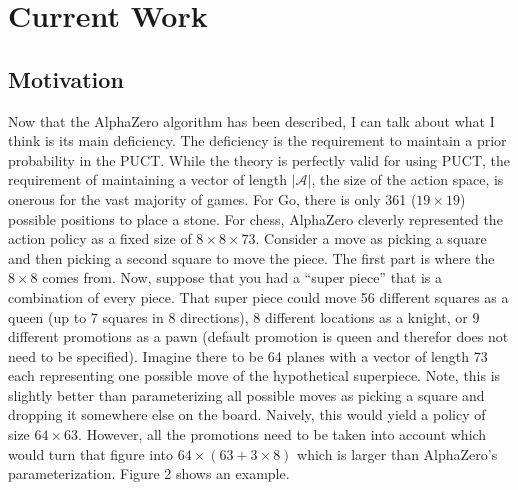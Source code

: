 \documentclass{article}
\begin{document}
  \clearpage

  \section{Current Work}

  \subsection{Motivation}

  Now that the AlphaZero algorithm has been described, I can talk about what I think is its main deficiency. The deficiency is the requirement to maintain a prior probability in the PUCT. While the theory is perfectly valid for using PUCT, the requirement of maintaining a vector of length $\lvert \mathcal{A} \rvert$, the size of the action space, is onerous for the vast majority of games. For Go, there is only 361 ($19 \times 19$) possible positions to place a stone. For chess, AlphaZero cleverly represented the action policy as a fixed size of $8 \times 8 \times 73$. Consider a move as picking a square and then picking a second square to move the piece. The first part is where the $8 \times 8$ comes from. Now, suppose that you had a ``super piece'' that is a combination of every piece. That super piece could move 56 different squares as a queen (up to 7 squares in 8 directions), 8 different locations as a knight, or 9 different promotions as a pawn (default promotion is queen and therefor does not need to be specified). Imagine there to be 64 planes with a vector of length 73 each representing one possible move of the hypothetical superpiece. Note, this is slightly better than parameterizing all possible moves as picking a square and dropping it somewhere else on the board. Naively, this would yield a policy of size $64 \times 63$. However, all the promotions need to be taken into account which would turn that figure into $64 \times (63 + 3 \times 8)$ which is larger than AlphaZero's parameterization. Figure 2 shows an example.
\end{document}
